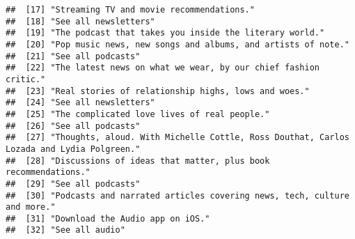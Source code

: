 \documentclass[
]{article}
\begin{document}
\begin{verbatim}
##  [17] "Streaming TV and movie recommendations."                                                                                                                  
##  [18] "See all newsletters"                                                                                                                                      
##  [19] "The podcast that takes you inside the literary world."                                                                                                    
##  [20] "Pop music news, new songs and albums, and artists of note."                                                                                               
##  [21] "See all podcasts"                                                                                                                                         
##  [22] "The latest news on what we wear, by our chief fashion critic."                                                                                            
##  [23] "Real stories of relationship highs, lows and woes."                                                                                                       
##  [24] "See all newsletters"                                                                                                                                      
##  [25] "The complicated love lives of real people."                                                                                                               
##  [26] "See all podcasts"                                                                                                                                         
##  [27] "Thoughts, aloud. With Michelle Cottle, Ross Douthat, Carlos Lozada and Lydia Polgreen."                                                                   
##  [28] "Discussions of ideas that matter, plus book recommendations."                                                                                             
##  [29] "See all podcasts"                                                                                                                                         
##  [30] "Podcasts and narrated articles covering news, tech, culture and more."                                                                                    
##  [31] "Download the Audio app on iOS."                                                                                                                           
##  [32] "See all audio"                                                                                                                                            

\end{verbatim}
\end{document}
